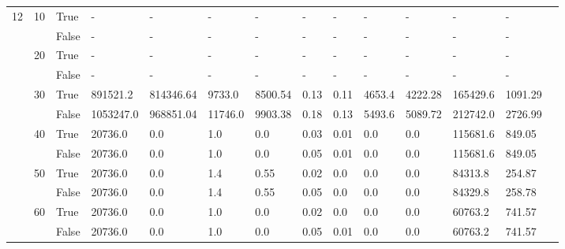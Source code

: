 \begin{landscape}
\begin{small}
\begin{longtable}[c]{@{}lll|ll|ll|ll|ll|lll@{}}
  \midrule
12 & 10 & True  & -               & -              & -             & -             & -             & -             & -             & -             & -             & -           &  \\
   &    & False & -               & -              & -             & -             & -             & -             & -             & -             & -             & -           &  \\
   & 20 & True  & -               & -              & -             & -             & -             & -             & -             & -             & -             & -           &  \\
   &    & False & -               & -              & -             & -             & -             & -             & -             & -             & -             & -           &  \\
   & 30 & True  & 891521.2        & 814346.64      & 9733.0        & 8500.54       & 0.13          & 0.11          & 4653.4        & 4222.28       & 165429.6      & 1091.29     &  \\
   &    & False & 1053247.0       & 968851.04      & 11746.0       & 9903.38       & 0.18          & 0.13          & 5493.6        & 5089.72       & 212742.0      & 2726.99     &  \\
   & 40 & True  & 20736.0         & 0.0            & 1.0           & 0.0           & 0.03          & 0.01          & 0.0           & 0.0           & 115681.6      & 849.05      &  \\
   &    & False & 20736.0         & 0.0            & 1.0           & 0.0           & 0.05          & 0.01          & 0.0           & 0.0           & 115681.6      & 849.05      &  \\
   & 50 & True  & 20736.0         & 0.0            & 1.4           & 0.55          & 0.02          & 0.0           & 0.0           & 0.0           & 84313.8       & 254.87      &  \\
   &    & False & 20736.0         & 0.0            & 1.4           & 0.55          & 0.05          & 0.0           & 0.0           & 0.0           & 84329.8       & 258.78      &  \\
   & 60 & True  & 20736.0         & 0.0            & 1.0           & 0.0           & 0.02          & 0.0           & 0.0           & 0.0           & 60763.2       & 741.57      &  \\
   &    & False & 20736.0         & 0.0            & 1.0           & 0.0           & 0.05          & 0.01          & 0.0           & 0.0           & 60763.2       & 741.57      &  \\

\end{longtable}
\end{small}
\end{landscape}
